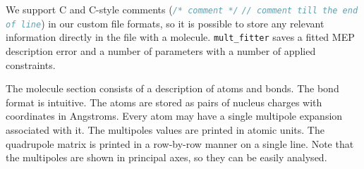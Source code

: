 \documentclass[10pt,a4paper]{article}
\begin{document}
We support C and C-style comments (\lstinline[language=C]{/* comment */} 
\lstinline[language=C]{// comment till the end of line}) in our custom 
file formats, so it
is possible to store any relevant information directly in the file with a molecule.
\lstinline{mult_fitter} saves a fitted MEP description error and a number of parameters 
with a number of applied constraints.

The molecule section consists of a description of atoms and bonds. The bond format is 
intuitive. The atoms are
stored as pairs of nucleus charges with coordinates in Angstroms. Every atom may have a
single multipole expansion associated with it. The multipoles values are printed in atomic
units. The quadrupole matrix is printed in a row-by-row manner on a single line. Note that
the multipoles are shown in principal axes, so they can be easily analysed.
\end{document}
